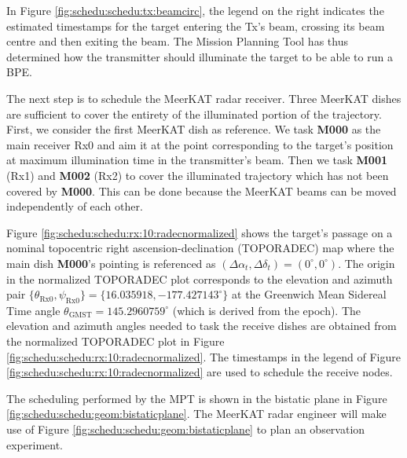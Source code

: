 \documentclass[conference]{IEEEtran}
\begin{document}
In Figure \ref{fig:schedu:schedu:tx:beamcirc}, the legend on the right indicates the estimated timestamps for the target entering the Tx's beam, crossing its beam centre and then exiting the beam. The Mission Planning Tool has thus determined how the transmitter should illuminate the target to be able to run a BPE.

The next step is to schedule the MeerKAT radar receiver. Three MeerKAT dishes are sufficient to cover the entirety of the illuminated portion of the trajectory. First, we consider the first MeerKAT dish as reference. We task \textbf{M000} as the main receiver Rx0 and aim it at the point corresponding to the target's position at maximum illumination time in the transmitter's beam. Then we task \textbf{M001} (Rx1) and \textbf{M002} (Rx2) to cover the illuminated trajectory which has not been covered by \textbf{M000}. This can be done because the MeerKAT beams can be moved independently of each other.

Figure \ref{fig:schedu:schedu:rx:10:radecnormalized} shows the target's passage on a nominal topocentric right ascension-declination (TOPORADEC) map where the main dish \textbf{M000}'s pointing is referenced as $(\Delta \alpha_t,\Delta \delta_t) = (0^\circ,0^\circ)$. The origin in the normalized TOPORADEC plot corresponds to the elevation and azimuth pair $\{\theta_{\text{Rx0}},\psi_{\text{Rx0}}\} = \{16.035918,-177.427143^\circ\}$ at the Greenwich Mean Sidereal Time angle $\theta_{\text{GMST}}=145.2960759^\circ$ (which is derived from the epoch). The elevation and azimuth angles needed to task the receive dishes are obtained from the normalized TOPORADEC plot in Figure \ref{fig:schedu:schedu:rx:10:radecnormalized}. The timestamps in the legend of Figure \ref{fig:schedu:schedu:rx:10:radecnormalized} are used to schedule the receive nodes. 

The scheduling performed by the MPT is shown in the bistatic plane in Figure \ref{fig:schedu:schedu:geom:bistaticplane}. The MeerKAT radar engineer will make use of Figure \ref{fig:schedu:schedu:geom:bistaticplane} to plan an observation experiment.
\end{document}

